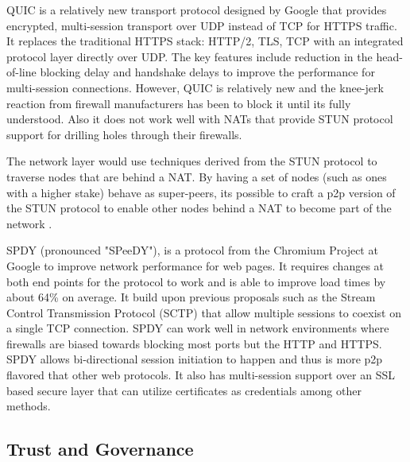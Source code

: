 QUIC is a relatively new transport protocol designed by Google \cite{quic_sigcomm} that provides encrypted, multi-session transport over UDP
instead of TCP for HTTPS traffic. It replaces the traditional HTTPS stack: HTTP/2, TLS, TCP with an integrated protocol
layer directly over UDP. The key features include reduction in the head-of-line blocking delay and handshake delays to
improve the performance for multi-session connections. However, QUIC is relatively new and the knee-jerk reaction from
firewall manufacturers has been to block it until its fully understood. Also it does not work well with NATs that
provide STUN protocol \cite{stun_protocol} support for drilling holes through their firewalls.  

The network layer would use techniques derived from the STUN protocol to traverse nodes
that are behind a NAT. By having a set of nodes (such as ones with a higher stake) behave as
super-peers, its possible to craft a p2p version of the STUN protocol to enable
other nodes behind a NAT to become part of the network \cite{p2p_nat}.

SPDY (pronounced "SPeeDY"), is a protocol from the Chromium Project at Google \cite{speedy_protocol} to improve network performance for web
pages. It requires changes at both end points for the protocol to work and is able to improve load times by about 64\%
on average. It build upon previous proposals such as the Stream Control Transmission Protocol (SCTP) \cite{sctp}
\cite{sctp_rfc} that allow multiple sessions to coexist on a single TCP connection. SPDY can work well in network
environments where firewalls are biased towards blocking most ports but the HTTP and HTTPS. SPDY allows bi-directional
session initiation to happen and thus is more p2p flavored that other web protocols. It also has multi-session support
over an SSL based secure layer that can utilize certificates as credentials among other methods.


\subsection{Trust and Governance}
\label{net:analytics}

